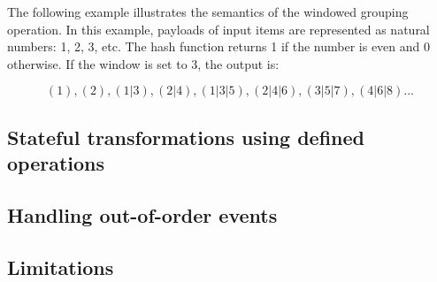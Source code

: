 The following example illustrates the semantics of the windowed grouping operation. In this example, payloads of input items are represented as natural numbers: 1, 2, 3, etc. The hash function returns 1 if the number is even and 0 otherwise. If the window is set to 3, the output is:

\[(1), (2), (1|3), (2|4), (1|3|5), (2|4|6), (3|5|7), (4|6|8)...\]

\subsection{Stateful transformations using defined operations}

\subsection{Handling out-of-order events}

\subsection{Limitations}




